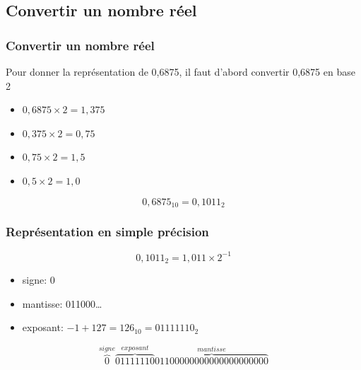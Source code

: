 \documentclass[svgnames,11pt]{beamer}
\begin{document}
\subsection{Convertir un nombre réel}
\begin{frame}
    \frametitle{Convertir un nombre réel}

    Pour donner la représentation de 0,6875, il faut d'abord convertir 0,6875 en base 2
    \begin{itemize}
        \item $0,6875×2 = 1,375$
        \item $0,375×2=0,75$
        \item $0,75×2=1,5$
        \item $0,5×2=1,0$
    \end{itemize}
$$0,6875_{10}=0,1011_2$$
\end{frame}
\begin{frame}
    \frametitle{Représentation en simple précision}

    {\LARGE$$0,1011_2=1,011×2^{-1}$$}
    \begin{itemize}
        \item signe: 0
        \item mantisse: 011000\dots
        \item exposant: $-1+127=126_{10}=01111110_2$
    \end{itemize}
    \bigskip
    $$\overbrace{0}^{signe}\overbrace{01111110}^{exposant}\overbrace{01100000000000000000000}^{mantisse}$$
\end{frame}
\end{document}
